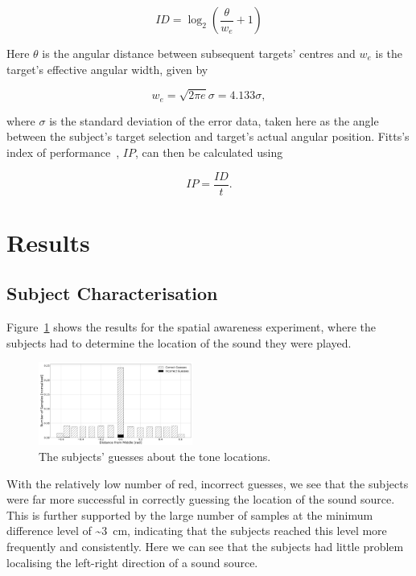 \documentclass[format=sigconf, review=true, screen=true, anonymous=true]{acmart}
\begin{document}
\begin{equation}
  \label{eq:fitts-id}
  ID = \log_2\left(\frac{\theta}{w_e} + 1\right)
\end{equation}

Here $\theta$ is the angular distance between subsequent targets' centres and $w_e$ is the target's effective angular width, given by

\begin{equation}
  w_e = \sqrt{2\pi e}\sigma = 4.133\sigma,
\end{equation}

\noindent
where $\sigma$ is the standard deviation of the error data, taken here as the angle between the subject's target selection and target's actual angular position. Fitts's index of performance~\cite[p.~390]{fitts1954information}, $IP$, can then be calculated using 

\begin{equation}
  \label{eq:fitts-performance}
  IP = \frac{ID}{t}.
\end{equation}

\section{Results}
\label{sec:results}

\subsection{Subject Characterisation}
\label{sec:character}

Figure~\ref{fig:location-guesses} shows the results for the spatial awareness experiment, where the subjects had to determine the location of the sound they were played. 

\begin{figure}
  \centering
  \includegraphics[width=0.45\textwidth]{figures/location_guesses.png}
  \caption{The subjects' guesses about the tone locations.}
  \label{fig:location-guesses}
\end{figure}

With the relatively low number of red, incorrect guesses, we see that the subjects were far more successful in correctly guessing the location of the sound source. This is further supported by the large number of samples at the minimum difference level of \textasciitilde\SI{3}{\cm}, indicating that the subjects reached this level more frequently and consistently. Here we can see that the subjects had little problem localising the left-right direction of a sound source. 
\end{document}
